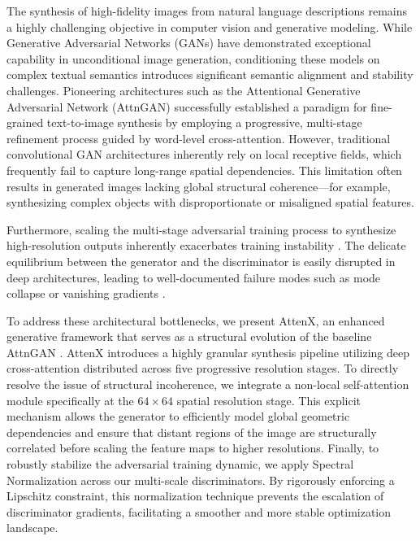 \documentclass[conference]{IEEEtran}
\begin{document}
The synthesis of high-fidelity images from natural language descriptions remains a highly challenging objective in computer vision and generative modeling. While Generative Adversarial Networks (GANs) \cite{goodfellow2014generative} have demonstrated exceptional capability in unconditional image generation, conditioning these models on complex textual semantics introduces significant semantic alignment and stability challenges. Pioneering architectures such as the Attentional Generative Adversarial Network (AttnGAN) \cite{xu2018attngan} successfully established a paradigm for fine-grained text-to-image synthesis by employing a progressive, multi-stage refinement process guided by word-level cross-attention. However, traditional convolutional GAN architectures inherently rely on local receptive fields, which frequently fail to capture long-range spatial dependencies. This limitation often results in generated images lacking global structural coherence---for example, synthesizing complex objects with disproportionate or misaligned spatial features.

Furthermore, scaling the multi-stage adversarial training process to synthesize high-resolution outputs inherently exacerbates training instability \cite{salimans2016improved}. The delicate equilibrium between the generator and the discriminator is easily disrupted in deep architectures, leading to well-documented failure modes such as mode collapse or vanishing gradients \cite{arjovsky2017wasserstein}.

To address these architectural bottlenecks, we present AttenX, an enhanced generative framework that serves as a structural evolution of the baseline AttnGAN \cite{xu2018attngan}. AttenX introduces a highly granular synthesis pipeline utilizing deep cross-attention distributed across five progressive resolution stages. To directly resolve the issue of structural incoherence, we integrate a non-local self-attention module \cite{wang2018nonlocal, zhang2019selfattention} specifically at the $64 \times 64$ spatial resolution stage. This explicit mechanism allows the generator to efficiently model global geometric dependencies and ensure that distant regions of the image are structurally correlated before scaling the feature maps to higher resolutions. Finally, to robustly stabilize the adversarial training dynamic, we apply Spectral Normalization \cite{miyato2018spectral} across our multi-scale discriminators. By rigorously enforcing a Lipschitz constraint, this normalization technique prevents the escalation of discriminator gradients, facilitating a smoother and more stable optimization landscape.
\end{document}
